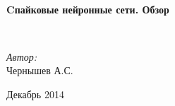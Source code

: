 \begin{titlepage}
\begin{center}
\HRule \\[0.4cm]
{ \huge \bfseries Cпайковые нейронные сети. Обзор \\[0.4cm] }

\HRule \\[1.5cm]

\begin{flushleft}
\emph{Автор:} \\
Чернышев А.С.
\end{flushleft}

\vfill

{\large Декабрь 2014}

\end{center}
\end{titlepage}
